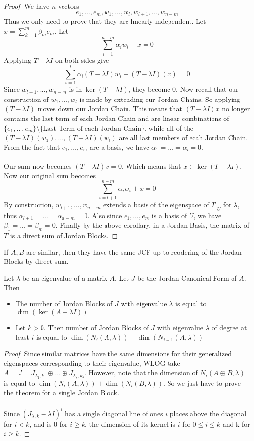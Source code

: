 \begin{thm}{}{}
\begin{proof}
We have $n$ vectors $$e_1,\dots,e_m,w_1,\dots,w_l,w_{l+1},\dots,w_{n-m}$$ Thus we only need to prove that they are linearly independent. Let $x=\sum_{k=1}^m\beta_me_m$. Let $$\sum_{i=1}^{n-m}\alpha_iw_i+x=0$$ Applying $T-\lambda I$ on both sides give $$\sum_{i=1}^{l}\alpha_i(T-\lambda I)w_i+(T-\lambda I)(x)=0$$ Since $w_{l+1},\dots,w_{n-m}$ is in $\ker(T-\lambda I)$, they become $0$. Now recall that our construction of $w_1,\dots,w_l$ is made by extending our Jordan Chains. So applying $(T-\lambda I)$ moves down our Jordan Chain. This means that $(T-\lambda I)x$ no longer contains the last term of each Jordan Chain and are linear combinations of $\{e_1,\dots,e_m\}\setminus\{\text{Last Term of each Jordan Chain}\}$, while all of the $(T-\lambda I)(w_1),\dots,(T-\lambda I)(w_l)$ are all last members of ecah Jordan Chain. From the fact that $e_1,\dots,e_m$ are a basis, we have $\alpha_1=\dots=\alpha_l=0$. \\~\\
Our sum now becomes $(T-\lambda I)x=0$. Which means that $x\in\ker(T-\lambda I)$. Now our original sum becomes $$\sum_{i=l+1}^{n-m}\alpha_iw_i+x=0$$ By construction, $w_{l+1},\dots,w_{n-m}$ extends a basis of the eigenspace of $T|_U$ for $\lambda$, thus $\alpha_{l+1}=\dots=\alpha_{n-m}=0$. Also since $e_1,\dots,e_m$ is a basis of $U$, we have $\beta_1=\dots=\beta_m=0$. 
Finally by the above corollary, in a Jordan Basis, the matrix of $T$ is a direct sum of Jordan Blocks. 
\end{proof}
\end{thm}


\begin{lmm}{}{} If $A,B$ are similar, then they have the same JCF up to reodering of the Jordan Blocks by direct sum. 
\end{lmm}

\begin{thm}{}{} Let $\lambda$ be an eigenvalue of a matrix $A$. Let $J$ be the Jordan Canonical Form of $A$. Then
\begin{itemize}
\item The number of Jordan Blocks of $J$ with eigenvalue $\lambda$ is equal to $\dim(\ker(A-\lambda I))$
\item Let $k>0$. Then number of Jordan Blocks of $J$ with eigenvalue $\lambda$ of degree at least $i$ is equal to $\dim(N_i(A,\lambda))-\dim(N_{i-1}(A,\lambda))$
\end{itemize}\tcbline\begin{proof} Since similar matrices have the same dimensions for their generalized eigenspaces corresponding to their eigenvalue, WLOG take $A=J=J_{\lambda_1,k_1}\oplus\dots\oplus J_{\lambda_s,k_s}$. However, note that the dimension of $N_i(A\oplus B,\lambda)$ is equal to $\dim(N_i(A,\lambda))+\dim(N_i(B,\lambda))$. So we just have to  prove the theorem for a single Jordan Block. \\~\\
Since $(J_{\lambda,k}-\lambda I)^i$ has a single diagonal line of ones $i$ places above the diagonal for $i<k$, and is $0$ for $i\geq k$, the dimension of its kernel is $i$ for $0\leq i\leq k$ and k for $i\geq k$. 
\end{proof}
\end{thm} 

